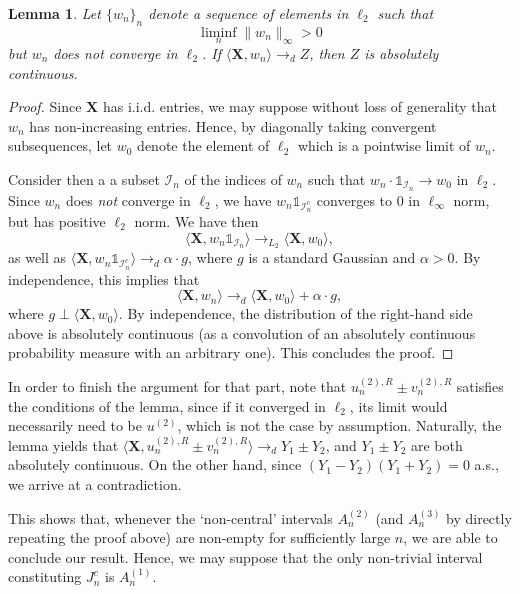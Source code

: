 \documentclass[a4paper,12pt]{amsart}
\numberwithin{equation}{section}
\newtheorem{lemma}[theorem]{Lemma}
\newcommand{\X}{\mathbf X}
\begin{document}
    \begin{lemma}
    Let $\{w_n\}_n$ denote a sequence of elements in $\ell_2$ such that 
    $$\liminf_n \|w_n\|_{\infty} > 0$$
    but $w_n$ does not converge in $\ell_2$. If $\langle \X, w_n\rangle \to_d Z$, then $Z$ is absolutely continuous. 
    \end{lemma}

    \begin{proof}
    Since $\X$ has i.i.d. entries, we may suppose without loss of generality that $w_n$ has non-increasing entries. Hence, by diagonally taking convergent subsequences, let $w_0$ denote the element of $\ell_2$ which is a pointwise limit of $w_n$. 

    Consider then a a subset $\mathcal{I}_n$ of the indices of $w_n$ such that $w_n \cdot \mathds{1}_{\mathcal{I}_n} \to w_0$ in $\ell_2$. Since $w_n$ does \emph{not} converge in $\ell_2$, we have $w_n \mathds{1}_{\mathcal{I}_n^c}$ converges to $0$ in $\ell_{\infty}$ norm, but has positive $\ell_2$ norm. We have then 
    \[
    \langle \X, w_n \mathds{1}_{\mathcal{I}_n}\rangle \to_{L_2} \langle \X, w_0 \rangle,
    \]
    as well as $\langle \X, w_n\mathds{1}_{\mathcal{I}_n^c}\rangle \to_d \alpha \cdot g$, 
    where $g$ is a standard Gaussian and $\alpha >0$.  By independence, this implies that 
    \[
    \langle \X, w_n \rangle \to_d \langle \X,w_0\rangle + \alpha \cdot g,
    \]
    where $g \perp \langle \X,w_0 \rangle$. By independence, the distribution of the right-hand side above is absolutely continuous (as a convolution of an absolutely continuous probability measure with an arbitrary one). This concludes the proof. 
    \end{proof}

 In order to finish the argument for that part, note that $u_n^{(2),R} \pm v_n^{(2),R}$ satisfies the conditions of the lemma, since if it converged in $\ell_2$, its limit would necessarily need to be $u^{(2)}$, which is not the case by assumption. Naturally, the lemma yields that $\langle \X, u_n^{(2),R} \pm v_n^{(2),R}\rangle \to_d Y_1 \pm Y_2$, and $Y_1 \pm Y_2$ are both absolutely continuous. On the other hand, since $(Y_1-Y_2)(Y_1+Y_2) = 0$ a.s., we arrive at a contradiction. 

 This shows that, whenever the `non-central' intervals $A_n^{(2)}$ (and $A_n^{(3)}$ by directly repeating the proof above) are non-empty for sufficiently large $n$, we are able to conclude our result. Hence, we may suppose that the only non-trivial interval constituting $J_n^c$ is $A_n^{(1)}$. \\
\end{document}

